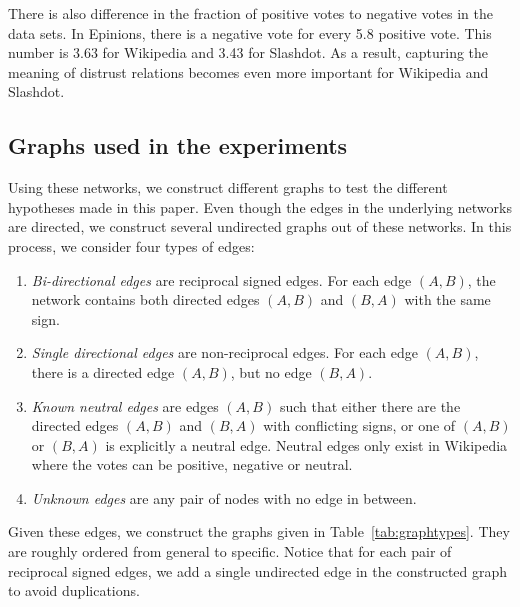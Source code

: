 \documentclass[acmtweb]{acmsmall}
\begin{document}
There is also difference in the fraction of positive votes to negative
votes in the data sets. In Epinions, there is a negative vote for
every 5.8 positive vote. This number is 3.63 for Wikipedia and 3.43
for Slashdot. As a result, capturing the meaning of distrust relations
becomes even more important for Wikipedia and Slashdot.

\subsection{Graphs used in the experiments}
Using these networks, we construct different graphs to test the
different hypotheses made in this paper. Even though the edges in the
underlying networks are directed, we construct several undirected
graphs out of these networks. In this process, we consider four types
of edges:

\begin{enumerate}
\item {\em Bi-directional edges} are reciprocal signed edges. For each
  edge $(A,B)$, the network contains both directed edges $(A,B)$ and
  $(B,A)$ with the same sign. 

\item {\em Single directional edges} are non-reciprocal edges. For
  each edge $(A,B)$, there is a directed edge $(A,B)$, but no edge
  $(B,A)$. 

\item {\em Known neutral edges} are edges $(A,B)$ such that either
  there are the directed edges $(A,B)$ and $(B,A)$ with conflicting
  signs, or one of $(A,B)$ or $(B,A)$ is explicitly a neutral
  edge. Neutral edges only exist in Wikipedia where the votes can be
  positive, negative or neutral.

\item {\em Unknown edges} are any pair of nodes with no edge in
  between.
\end{enumerate}

Given these edges, we construct the graphs given in
Table~\ref{tab:graphtypes}. They are roughly ordered from general to
specific. Notice that for each pair of reciprocal signed edges, we add
a single undirected edge in the constructed graph to avoid
duplications.
\end{document}

